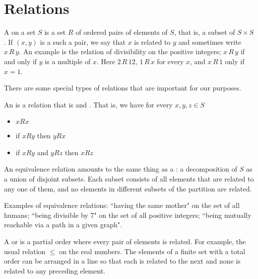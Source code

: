 \section{Relations}
\label{sec:app:relations}

A  on a set $S$ is a set $R$ of ordered pairs of
elements of $S$, that is, a subset of $S\times S$. If $(x, y)$ is a such
a pair, we say that $x$ is related to $y$ and sometimes write $x\,R\,y$. An
example is the relation of divisibility on the positive integers;
$x\,R\,y$
if and only if $y$ is a multiple of $x$. Here $2 \,R \, 12$, $1\, R\,
x$ for every $x$, and $x\,R\,1$ only if $x=1$.

There are some special types of relations that are important for our purposes.

An  is a relation that is
 and . That is,
we have for every $x, y, z\in S$
\begin{itemize}
\item $x R x$

\item if $x R y$ then $y R x$

\item if $x R y$ and $y R z$ then $x R z$

\end{itemize}

An equivalence relation amounts to the same thing as a
: a decomposition of $S$ as a union of disjoint
subsets. Each subset consists of all elements that are related to any
one of them, and no elements in different subsets of the partition
are related.

Examples of equivalence relations: ``having the same mother" on the set of
all humans; ``being divisible by 7" on the set of all positive integers;
``being mutually reachable via a path in a given graph".


A  or  is a partial order
where every pair of elements is related. For example, the usual relation
$\leq $ on the real numbers. The elements of a finite set with a total
order can be arranged in a line so that each is related to the next and
none is related to any preceding element.

